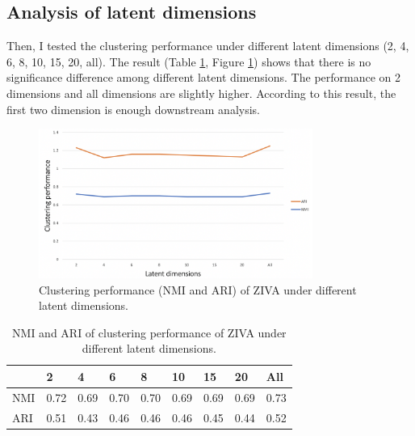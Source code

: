 \subsection{Analysis of latent dimensions}
Then, I tested the clustering performance under different latent dimensions (2, 4, 6, 8, 10, 15, 20, all). The result (Table \ref{dimt}, Figure \ref{dim}) shows that there is no significance difference among different latent dimensions. The performance on 2 dimensions and all dimensions are slightly higher. According to this result, the first two dimension is enough downstream analysis.
\begin{figure}[htb!]
    \centering
    \includegraphics[width=0.8\textwidth]{figures/myfigures/dim.png}
    \caption{Clustering performance (NMI and ARI) of ZIVA under different latent dimensions.}
    \label{dim}
\end{figure}

\begin{table}[htb!]
\centering
\caption{NMI and ARI of clustering performance of ZIVA under different latent dimensions.}
\label{dimt}
\begin{tabular}{lllllllll}
\hline
    & 2    & 4    & 6    & 8    & 10   & 15   & 20   & All  \\ \hline
NMI & 0.72 & 0.69 & 0.70 & 0.70 & 0.69 & 0.69 & 0.69 & 0.73 \\
ARI & 0.51 & 0.43 & 0.46 & 0.46 & 0.46 & 0.45 & 0.44 & 0.52 \\ \hline
\end{tabular}
\end{table}